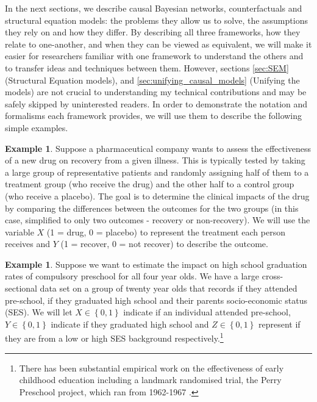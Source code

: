 \documentclass[11pt,a4paper,twoside]{report}
\newcommand{\set}[1]{\left\{#1\right\}}
\theoremstyle{plain}
\theoremstyle{definition}
\newtheorem{example}[theorem]{Example}
\begin{document}
In the next sections, we describe causal Bayesian networks, counterfactuals and structural equation models: the problems they allow us to solve, the assumptions they rely on and how they differ. By describing all three frameworks, how they relate to one-another, and when they can be viewed as equivalent, we will make it easier for researchers familiar with one framework to understand the others and to transfer ideas and techniques between them. However, sections \ref{sec:SEM} (Structural Equation models), and \ref{sec:unifying_causal_models} (Unifying the models) are not crucial to understanding my technical contributions and may be safely skipped by uninterested readers. In order to demonstrate the notation and formalisms each framework provides, we will use them to describe the following simple examples. 

\vspace*{.3cm}
\begin{example}
\label{exm:ranomized_experiment}
Suppose a pharmaceutical company wants to assess the effectiveness of a new drug on recovery from a given illness. This is typically tested by taking a large group of representative patients and randomly assigning half of them to a treatment group (who receive the drug) and the other half to a control group (who receive a placebo). The goal is to determine the clinical impacts of the drug by comparing the differences between the outcomes for the two groups (in this case, simplified to only two outcomes - recovery or non-recovery). We will use the variable $X$ (1 = drug, 0 = placebo) to represent the treatment each person receives and $Y$ (1 = recover, 0 = not recover) to describe the outcome. 
\end{example}

\vspace*{.3cm}
\begin{example}
\label{exm:adjusting}
Suppose we want to estimate the impact on high school graduation rates of compulsory preschool for all four year olds. We have a large cross-sectional data set on a group of twenty year olds that records if they attended pre-school, if they graduated high school and their parents socio-economic status (SES). We will let $X\in \set{0,1}$ indicate if an individual attended pre-school, $Y \in \set{0,1}$ indicate if they graduated high school and $Z \in \set{0,1}$ represent if they are from a low or high SES background respectively.\footnote{There has been substantial empirical work on the effectiveness of early childhood education including a landmark randomised trial, the Perry Preschool project, which ran from 1962-1967 \citep{weikart1970longitudinal}.}
\end{example}
\end{document}
